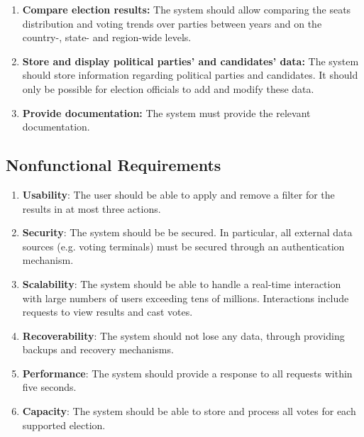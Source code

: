 \documentclass[a4paper]{article}
\begin{document}
\begin{enumerate}[leftmargin=*,labelindent=16pt,label=\bfseries FR\arabic*. \hspace{0.1cm}]
  \item \textbf{Compare election results:} The system should allow comparing the seats distribution and voting trends over parties between years and on the country-, state- and region-wide levels.

  \item \textbf{Store and display political parties' and candidates' data:} The system should store information regarding political parties and candidates. It should only be possible for election officials to add and modify these data.

  \item \textbf{Provide documentation:} The system must provide the relevant documentation.

\end{enumerate}

\subsection{Nonfunctional Requirements}
\begin{enumerate}[leftmargin=*,labelindent=16pt,label=\bfseries NFR\arabic*. \hspace{0.1cm}]
\item \textbf{Usability}: The user should be able to apply and remove a filter for the results in at most three actions.

\item \textbf{Security}: The system should be be secured. In particular, all external data sources (e.g. voting terminals) must be secured through an authentication mechanism.

\item \textbf{Scalability}: The system should be able to handle a real-time interaction with large numbers of users exceeding tens of millions. Interactions include requests to view results and cast votes.

\item \textbf{Recoverability}: The system should not lose any data, through providing backups and recovery mechanisms.

\item \textbf{Performance}: The system should provide a response to all requests within five seconds.

\item \textbf{Capacity}: The system should be able to store and process all votes for each supported election.

\end{enumerate}
\end{document}
